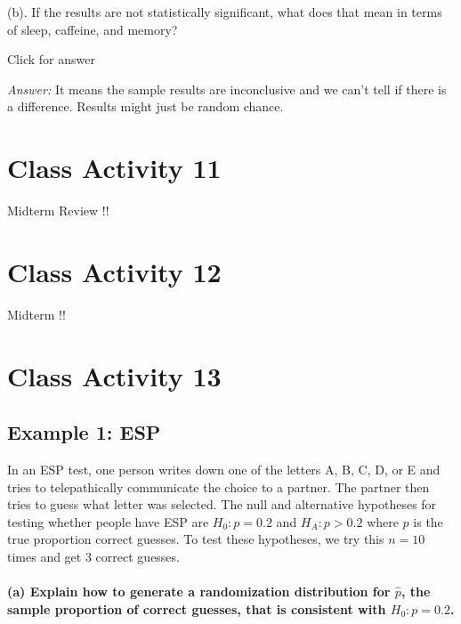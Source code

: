 \documentclass[
]{book}
\begin{document}
(b). If the results are not statistically significant, what does that mean in terms of sleep, caffeine, and memory?

Click for answer

\emph{Answer:} It means the sample results are inconclusive and we can't tell if there is a difference. Results might just be random chance.

\hypertarget{class-activity-11}{%
\chapter{Class Activity 11}\label{class-activity-11}}

Midterm Review !!

\hypertarget{class-activity-12}{%
\chapter{Class Activity 12}\label{class-activity-12}}

Midterm !!

\hypertarget{class-activity-13}{%
\chapter{Class Activity 13}\label{class-activity-13}}

\hypertarget{example-1-esp}{%
\section{Example 1: ESP}\label{example-1-esp}}

In an ESP test, one person writes down one of the letters A, B, C, D, or E and tries to telepathically communicate the choice to a partner. The partner then tries to guess what letter was selected. The null and alternative hypotheses for testing whether people have ESP are \(H_0: p=0.2\) and \(H_A: p > 0.2\) where \(p\) is the true proportion correct guesses. To test these hypotheses, we try this \(n=10\) times and get 3 correct guesses.

\hypertarget{a-explain-how-to-generate-a-randomization-distribution-for-hatp-the-sample-proportion-of-correct-guesses-that-is-consistent-with-h_0-p0.2.}{%
\subsubsection{\texorpdfstring{(a) Explain how to generate a randomization distribution for \(\hat{p}\), the sample proportion of correct guesses, that is consistent with \(H_0: p=0.2\).}{(a) Explain how to generate a randomization distribution for \textbackslash hat\{p\}, the sample proportion of correct guesses, that is consistent with H\_0: p=0.2.}}\label{a-explain-how-to-generate-a-randomization-distribution-for-hatp-the-sample-proportion-of-correct-guesses-that-is-consistent-with-h_0-p0.2.}}
\end{document}
